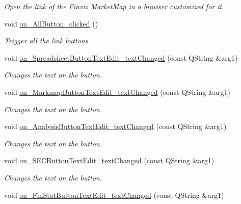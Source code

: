 \begin{DoxyCompactItemize}
\begin{DoxyCompactList}\small\item\em Open the link of the Finviz Market\+Map in a browser customized for it. \end{DoxyCompactList}\item 
\hypertarget{class_t_k_r_t_a_p_ac34089a7673199ae27b6cbc3e4f20ffe}{void \hyperlink{class_t_k_r_t_a_p_ac34089a7673199ae27b6cbc3e4f20ffe}{on\+\_\+\+All\+Button\+\_\+clicked} ()}\label{class_t_k_r_t_a_p_ac34089a7673199ae27b6cbc3e4f20ffe}

\begin{DoxyCompactList}\small\item\em Trigger all the link buttons. \end{DoxyCompactList}\item 
void \hyperlink{class_t_k_r_t_a_p_aea76795d49f0ce78a0f1ddf1bd47cd75}{on\+\_\+\+Spreadsheet\+Button\+Text\+Edit\+\_\+text\+Changed} (const Q\+String \&arg1)
\begin{DoxyCompactList}\small\item\em Changes the text on the button. \end{DoxyCompactList}\item 
void \hyperlink{class_t_k_r_t_a_p_aa01ac37701db845187a9462e703d089f}{on\+\_\+\+Markmap\+Button\+Text\+Edit\+\_\+text\+Changed} (const Q\+String \&arg1)
\begin{DoxyCompactList}\small\item\em Changes the text on the button. \end{DoxyCompactList}\item 
void \hyperlink{class_t_k_r_t_a_p_a52aeb4ceba84acce2a98e8e059eeed9f}{on\+\_\+\+Analysis\+Button\+Text\+Edit\+\_\+text\+Changed} (const Q\+String \&arg1)
\begin{DoxyCompactList}\small\item\em Changes the text on the button. \end{DoxyCompactList}\item 
void \hyperlink{class_t_k_r_t_a_p_a13ba09fe615e6ea1a8aede0589b79bce}{on\+\_\+\+S\+E\+C\+Button\+Text\+Edit\+\_\+text\+Changed} (const Q\+String \&arg1)
\begin{DoxyCompactList}\small\item\em Changes the text on the button. \end{DoxyCompactList}\item 
void \hyperlink{class_t_k_r_t_a_p_ab614bb00b5d68ea8ddb0c87a028c9687}{on\+\_\+\+Fin\+Stat\+Button\+Text\+Edit\+\_\+text\+Changed} (const Q\+String \&arg1)

\end{DoxyCompactItemize}

